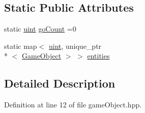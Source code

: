 \subsection*{Static Public Attributes}
\begin{DoxyCompactItemize}
\item 
static \hyperlink{common_8hpp_a69aa29b598b851b0640aa225a9e5d61d}{uint} \hyperlink{class_game_object_a10af93a9092e2366773a4c8a26527d6d}{go\-Count} =0
\item 
static map$<$ \hyperlink{common_8hpp_a69aa29b598b851b0640aa225a9e5d61d}{uint}, unique\-\_\-ptr\\*
$<$ \hyperlink{class_game_object}{Game\-Object} $>$ $>$ \hyperlink{class_game_object_a10fad154fed185ee6fc1d3b529288e32}{entities}
\end{DoxyCompactItemize}


\subsection{Detailed Description}


Definition at line 12 of file game\-Object.\-hpp.



